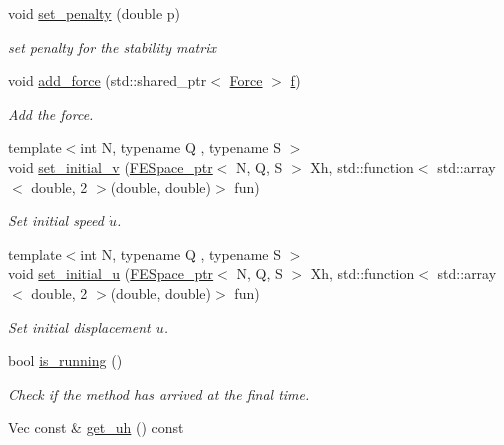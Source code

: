 \begin{DoxyCompactItemize}
void \hyperlink{classTspeed_1_1TimeAdvance_af635a6b3e94ff39467817c4b3890feb4}{set\-\_\-penalty} (double p)
\begin{DoxyCompactList}\small\item\em set penalty for the stability matrix \end{DoxyCompactList}\item 
void \hyperlink{classTspeed_1_1TimeAdvance_a248fe5d89a8bff234c84bac80ed31adf}{add\-\_\-force} (std\-::shared\-\_\-ptr$<$ \hyperlink{classTspeed_1_1Force}{Force} $>$ \hyperlink{classTspeed_1_1TimeAdvance_a36dea2ae6ba03546806bbacb83697c01}{f})
\begin{DoxyCompactList}\small\item\em Add the force. \end{DoxyCompactList}\item 
{\footnotesize template$<$int N, typename Q , typename S $>$ }\\void \hyperlink{classTspeed_1_1TimeAdvance_a5565d8938d39054dbceae8b5fb26f6bc}{set\-\_\-initial\-\_\-v} (\hyperlink{namespaceTspeed_a05fcb57094666c8f5ab1e90d1a6fecf8}{F\-E\-Space\-\_\-ptr}$<$ N, Q, S $>$ Xh, std\-::function$<$ std\-::array$<$ double, 2 $>$(double, double)$>$ fun)
\begin{DoxyCompactList}\small\item\em Set initial speed $ \dot{u} $. \end{DoxyCompactList}\item 
{\footnotesize template$<$int N, typename Q , typename S $>$ }\\void \hyperlink{classTspeed_1_1TimeAdvance_a458fb8edb53992055aceb6fee44f506a}{set\-\_\-initial\-\_\-u} (\hyperlink{namespaceTspeed_a05fcb57094666c8f5ab1e90d1a6fecf8}{F\-E\-Space\-\_\-ptr}$<$ N, Q, S $>$ Xh, std\-::function$<$ std\-::array$<$ double, 2 $>$(double, double)$>$ fun)
\begin{DoxyCompactList}\small\item\em Set initial displacement $ {u} $. \end{DoxyCompactList}\item 
bool \hyperlink{classTspeed_1_1TimeAdvance_a31398b7880b86622ba3c1378e2ac91d1}{is\-\_\-running} ()
\begin{DoxyCompactList}\small\item\em Check if the method has arrived at the final time. \end{DoxyCompactList}\item 
Vec const \& \hyperlink{classTspeed_1_1TimeAdvance_a3b4a0ed12f2fea72ce004dcdf467f10a}{get\-\_\-uh} () const 

\end{DoxyCompactItemize}
